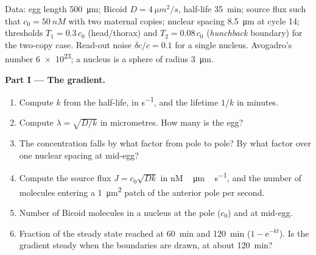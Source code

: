 \begin{problem}
\label{pb:b3:developmental-genetics:1}
Data: egg length \qty{500}{\micro m}; Bicoid $D = \qty{4}{\micro m^2/s}$,
half-life \qty{35}{min}; source flux such that $c_{0} = \qty{50}{nM}$
with two maternal copies; nuclear spacing \qty{8.5}{\micro m} at cycle
14; thresholds $T_{1} = 0.3\,c_{0}$ (head/thorax) and $T_{2} =
0.08\,c_{0}$ (\emph{hunchback} boundary) for the two-copy case. Read-out
noise $\delta c/c = 0.1$ for a single nucleus. Avogadro's number
\qty{6e23}{}; a nucleus is a sphere of radius \qty{3}{\micro m}.

\medskip
\noindent\textbf{Part I --- The gradient.}
\begin{enumerate}
  \item Compute $k$ from the half-life, in \unit{s^{-1}}, and the
        lifetime $1/k$ in minutes.
  \item Compute $\lambda = \sqrt{D/k}$ in micrometres. How many  is the egg?
  \item The concentration falls by what factor from pole to pole? By
        what factor over one nuclear spacing at mid-egg?
  \item Compute the source flux $J = c_{0}\sqrt{Dk}$ in
        \unit{nM\,\micro m\,s^{-1}}, and the number of molecules
        entering a \qty{1}{\micro m^2} patch of the anterior pole per
        second.
  \item Number of Bicoid molecules in a nucleus at the pole ($c_{0}$)
        and at mid-egg.
  \item Fraction of the steady state reached at \qty{60}{min} and
        \qty{120}{min} ($1 - \mathrm{e}^{-kt}$). Is the gradient steady
        when the boundaries are drawn, at about \qty{120}{min}?
\end{enumerate}


\end{problem}
